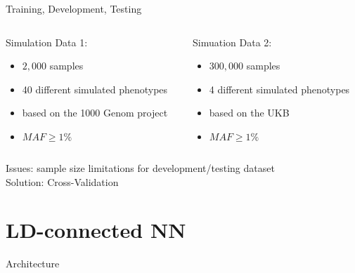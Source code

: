 \documentclass{beamer}
\begin{document}
\begin{frame}[t]{Training, Development, Testing}
  \begin{columns}
    \begin{column}{0.5\textwidth}
      Simulation Data 1:\\
      \begin{itemize}
        \item $2,000$ samples
        \item 40 different simulated phenotypes
        \item based on the 1000 Genom project
        \item $MAF\geq1\%$
      \end{itemize}
    \end{column}
    \begin{column}{0.5\textwidth}
     Simuation Data 2: 
     \begin{itemize}
       \item $300,000$ samples
       \item 4 different simulated phenotypes
       \item based on the UKB
        \item $MAF\geq1\%$
     \end{itemize}
    \end{column}
  \end{columns}
  Issues: sample size limitations for development/testing dataset
\\
  Solution: Cross-Validation
\end{frame}

\section{LD-connected NN}

\begin{frame}[t]{Architecture}
  
\end{frame}
\end{document}

